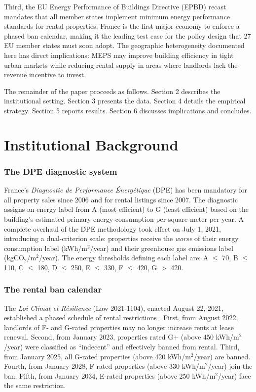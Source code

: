 \documentclass[12pt]{article}
\begin{document}
Third, the EU Energy Performance of Buildings Directive (EPBD) recast \citep{epbd2024} mandates that all member states implement minimum energy performance standards for rental properties. France is the first major economy to enforce a phased ban calendar, making it the leading test case for the policy design that 27 EU member states must soon adopt. The geographic heterogeneity documented here has direct implications: MEPS may improve building efficiency in tight urban markets while reducing rental supply in areas where landlords lack the revenue incentive to invest.

The remainder of the paper proceeds as follows. Section 2 describes the institutional setting. Section 3 presents the data. Section 4 details the empirical strategy. Section 5 reports results. Section 6 discusses implications and concludes.


\section{Institutional Background}

\subsubsection*{The DPE diagnostic system} France's \textit{Diagnostic de Performance \'{E}nerg\'{e}tique} (DPE) has been mandatory for all property sales since 2006 and for rental listings since 2007. The diagnostic assigns an energy label from A (most efficient) to G (least efficient) based on the building's estimated primary energy consumption per square meter per year. A complete overhaul of the DPE methodology took effect on July 1, 2021, introducing a dual-criterion scale: properties receive the \textit{worse} of their energy consumption label (kWh/m$^2$/year) and their greenhouse gas emissions label (kgCO$_2$/m$^2$/year). The energy thresholds defining each label are: A $\leq$ 70, B $\leq$ 110, C $\leq$ 180, D $\leq$ 250, E $\leq$ 330, F $\leq$ 420, G $>$ 420.

\subsubsection*{The rental ban calendar} The \textit{Loi Climat et R\'{e}silience} (Law 2021-1104), enacted August 22, 2021, established a phased schedule of rental restrictions \citep{loiclimat2021}. First, from August 2022, landlords of F- and G-rated properties may no longer increase rents at lease renewal. Second, from January 2023, properties rated G+ (above 450 kWh/m$^2$/year) were classified as ``indecent'' and effectively banned from rental. Third, from January 2025, all G-rated properties (above 420 kWh/m$^2$/year) are banned. Fourth, from January 2028, F-rated properties (above 330 kWh/m$^2$/year) join the ban. Fifth, from January 2034, E-rated properties (above 250 kWh/m$^2$/year) face the same restriction.
\end{document}
